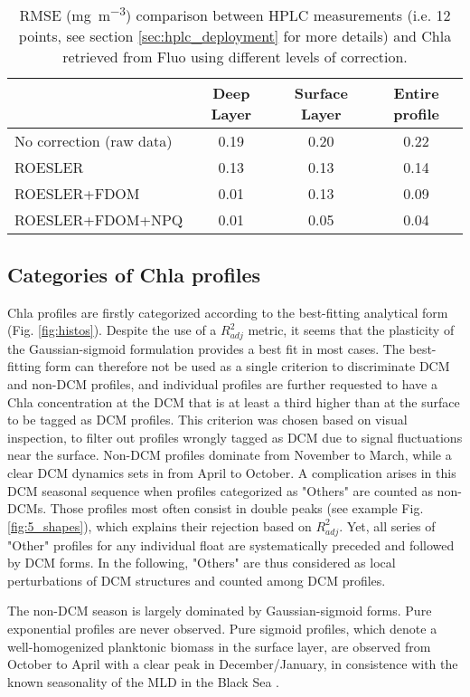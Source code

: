 \documentclass[journal abbreviation, manuscript]{copernicus}
\begin{document}
\begin{table}[h]
    \centering
    \begin{tabular}{l c c c}
         & Deep Layer & Surface Layer & Entire profile  \\ \hline
         No correction (raw data)             & 0.19 & 0.20 & 0.22 \\
         ROESLER          & 0.13  & 0.13  & 0.14  \\
         ROESLER+FDOM     & 0.01 & 0.13 & 0.09 \\
         ROESLER+FDOM+NPQ & 0.01 & 0.05 & 0.04
    \end{tabular}
    \caption{RMSE (\unit{mg~m^{-3}}) comparison between HPLC measurements (i.e. 12 points, see section \ref{sec:hplc_deployment} for more details) and Chla retrieved from Fluo using different levels of correction.}
    \label{tab:my_label}
\end{table}

\subsection{Categories of Chla profiles}
\label{sec:cat}
Chla profiles are firstly categorized according to the best-fitting analytical form (Fig. \ref{fig:histos}).
Despite the use of a $R^2_{adj}$ metric, it seems that the plasticity of the Gaussian-sigmoid formulation provides a best fit in most cases.
The best-fitting form can therefore not be used as a single criterion to discriminate DCM and non-DCM profiles, and individual profiles are further requested to have a Chla concentration at the DCM that is at least a third higher than at the surface to be tagged as DCM profiles.
This criterion was chosen based on visual inspection, to filter out profiles wrongly tagged as DCM due to signal fluctuations near the surface. 
Non-DCM profiles dominate from November to March, while a clear DCM dynamics sets in from April to October.
A complication arises in this DCM seasonal sequence when profiles categorized as "Others" are counted as non-DCMs.
Those profiles most often consist in double peaks (see example Fig. \ref{fig:5_shapes}), which explains their rejection based on $R^2_{adj}$.
Yet, all series of "Other" profiles for any individual float are systematically preceded and followed by DCM forms.
In the following, "Others" are thus considered as local perturbations of DCM structures \citep[e.g.][]{Mikaelyan2020} and counted among DCM profiles. 

The non-DCM season is largely dominated by Gaussian-sigmoid forms.
Pure exponential profiles are never observed.
Pure sigmoid profiles, which denote a well-homogenized planktonic biomass in the surface layer, are observed from October to April with a clear peak in December/January, in consistence with the known seasonality of the MLD in the Black Sea \citep[e.g.][]{Capet2014}.
\end{document}
